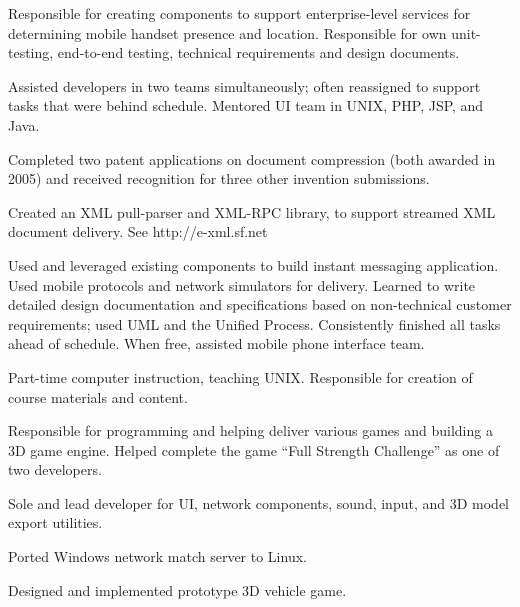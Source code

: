 \documentclass{article}
\begin{document}
  

Responsible for creating components to support enterprise-level services
for determining mobile handset presence and location.  Responsible for own
unit-testing, end-to-end testing, technical requirements and design
documents.
\begin{items}
\item Assisted developers in two teams simultaneously; often reassigned
to support tasks that were behind schedule.  Mentored UI team in
UNIX, PHP, JSP, and Java.
\item Completed two patent applications on document compression (both awarded
in 2005) and received recognition for three other invention submissions.
\item Created an XML pull-parser and XML-RPC library, to support streamed
XML document delivery.  See http://e-xml.sf.net
\end{items}

Used and leveraged existing components to build instant messaging application.
Used mobile protocols and network simulators for delivery.  Learned to write
detailed design documentation and specifications based on non-technical
customer requirements; used UML and the Unified Process.  Consistently finished
all tasks ahead of schedule.  When free, assisted mobile phone interface team.

  
Part-time computer instruction, teaching UNIX.  Responsible for creation
of course materials and content.  

  
Responsible for programming and helping deliver various games and
building a 3D game engine.  Helped complete the game ``Full Strength
Challenge'' as one of two developers.
\begin{items}
\item Sole and lead developer for UI, network components, sound, input,
and 3D model export utilities.
\item Ported Windows network match server to Linux.
\item Designed and implemented prototype 3D vehicle game.
\end{items}
\end{document}
